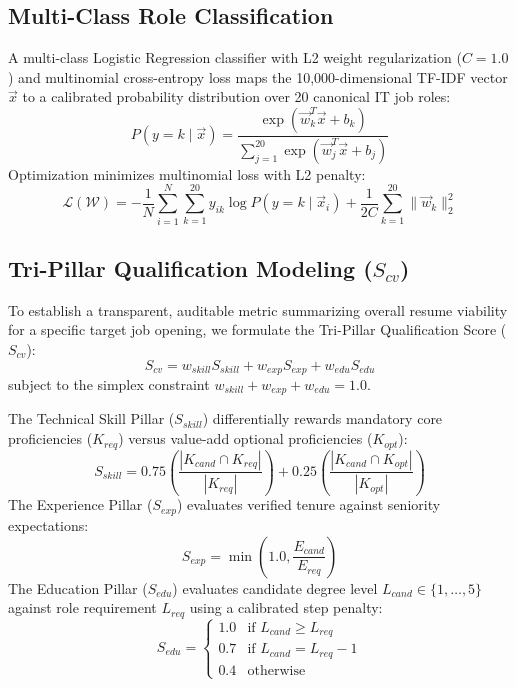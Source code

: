 \documentclass[conference]{IEEEtran}
\begin{document}
\subsection{Multi-Class Role Classification}
A multi-class Logistic Regression classifier with L2 weight regularization ($C = 1.0$) and multinomial cross-entropy loss maps the 10,000-dimensional TF-IDF vector $\vec{x}$ to a calibrated probability distribution over 20 canonical IT job roles:
\begin{equation}
P(y = k \mid \vec{x}) = \frac{\exp(\vec{w}_k^T \vec{x} + b_k)}{\sum_{j=1}^{20} \exp(\vec{w}_j^T \vec{x} + b_j)}
\end{equation}
Optimization minimizes multinomial loss with L2 penalty:
\begin{equation}
\mathcal{L}(\mathcal{W}) = -\frac{1}{N}\sum_{i=1}^N \sum_{k=1}^{20} y_{ik} \log P(y = k \mid \vec{x}_i) + \frac{1}{2C} \sum_{k=1}^{20} \|\vec{w}_k\|_2^2
\end{equation}

\subsection{Tri-Pillar Qualification Modeling ($S_{cv}$)}
To establish a transparent, auditable metric summarizing overall resume viability for a specific target job opening, we formulate the Tri-Pillar Qualification Score ($S_{cv}$):
\begin{equation}
S_{cv} = w_{skill} S_{skill} + w_{exp} S_{exp} + w_{edu} S_{edu}
\end{equation}
subject to the simplex constraint $w_{skill} + w_{exp} + w_{edu} = 1.0$.

The Technical Skill Pillar ($S_{skill}$) differentially rewards mandatory core proficiencies ($K_{req}$) versus value-add optional proficiencies ($K_{opt}$):
\begin{equation}
S_{skill} = 0.75 \left(\frac{|K_{cand} \cap K_{req}|}{|K_{req}|}\right) + 0.25 \left(\frac{|K_{cand} \cap K_{opt}|}{|K_{opt}|}\right)
\end{equation}
The Experience Pillar ($S_{exp}$) evaluates verified tenure against seniority expectations:
\begin{equation}
S_{exp} = \min\left(1.0, \frac{E_{cand}}{E_{req}}\right)
\end{equation}
The Education Pillar ($S_{edu}$) evaluates candidate degree level $L_{cand} \in \{1, \dots, 5\}$ against role requirement $L_{req}$ using a calibrated step penalty:
\begin{equation}
S_{edu} = \begin{cases} 
1.0 & \text{if } L_{cand} \ge L_{req} \\ 
0.7 & \text{if } L_{cand} = L_{req} - 1 \\ 
0.4 & \text{otherwise} 
\end{cases}
\end{equation}
\end{document}
